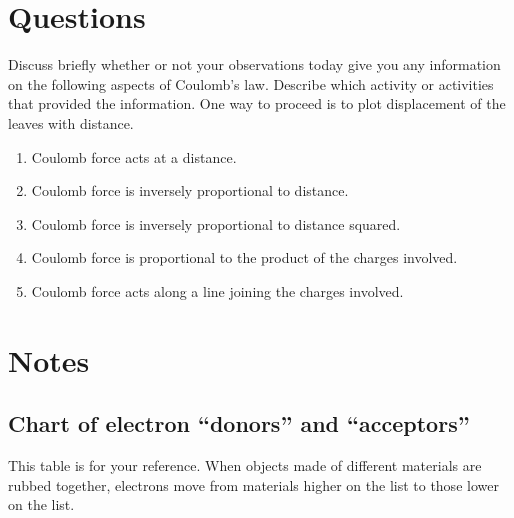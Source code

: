 \section{Questions}

Discuss briefly whether or not your observations today give you any information on the following aspects of Coulomb's law.  Describe which activity or activities that provided the information. One way to proceed is to plot displacement of the leaves with distance.
\begin{enumerate}
	\item Coulomb force acts at a distance.
	\item Coulomb force is inversely proportional to distance.
	\item Coulomb force is inversely proportional to distance squared.
	\item Coulomb force is proportional to the product of the charges involved.
	\item Coulomb force acts along a line joining the charges involved.
\end{enumerate}

\newpage
\section*{Notes}
\subsection*{Chart of electron ``donors'' and ``acceptors''}
This table is for your reference. When objects made of different materials are rubbed together, electrons move from materials higher on the list to those lower on the list.


